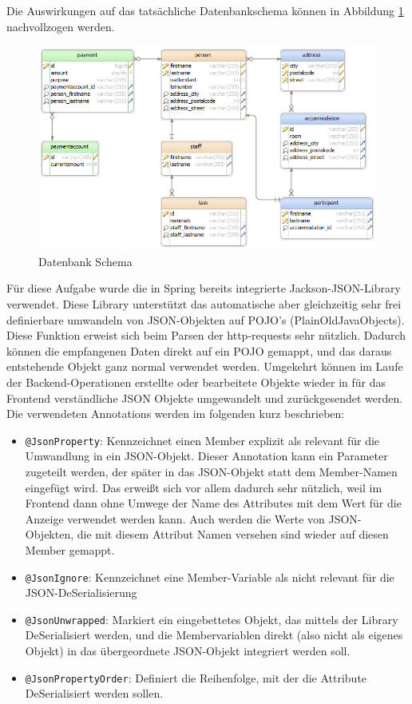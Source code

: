 Die Auswirkungen auf das tatsächliche Datenbankschema können in Abbildung \ref{fig:db_scheme} nachvollzogen werden.

\begin{figure}[h]
	\centering
	\includegraphics[width=0.9\linewidth]{3_backend/pics/db_scheme}
	\caption{Datenbank Schema}
	\label{fig:db_scheme}
\end{figure}


Für diese Aufgabe wurde die in Spring bereits integrierte Jackson-JSON-Library verwendet. Diese Library unterstützt das automatische aber gleichzeitig sehr frei definierbare umwandeln von JSON-Objekten auf POJO's (PlainOldJavaObjects). Diese Funktion erweist sich beim Parsen der http-requests sehr nützlich. Dadurch können die empfangenen Daten direkt auf ein POJO gemappt, und das daraus entstehende Objekt ganz normal verwendet werden. Umgekehrt können im Laufe der Backend-Operationen erstellte oder bearbeitete Objekte wieder in für das Frontend verständliche JSON Objekte umgewandelt und zurückgesendet werden. Die verwendeten Annotations werden im folgenden kurz beschrieben:

\begin{itemize}
	\item \verb|@JsonProperty|: Kennzeichnet einen Member explizit als relevant für die Umwandlung in ein JSON-Objekt. Dieser Annotation kann ein Parameter zugeteilt werden, der später in das JSON-Objekt statt dem Member-Namen eingefügt wird. Das erweißt sich vor allem dadurch sehr nützlich, weil im Frontend dann ohne Umwege der Name des Attributes mit dem Wert für die Anzeige verwendet werden kann. Auch werden die Werte von JSON-Objekten, die mit diesem Attribut Namen versehen sind wieder auf diesen Member gemappt.
	\item \verb|@JsonIgnore|: Kennzeichnet eine Member-Variable als nicht relevant für die JSON-DeSerialisierung
	\item \verb|@JsonUnwrapped|: Markiert ein eingebettetes Objekt, das mittels der Library DeSerialisiert werden, und die Membervariablen direkt (also nicht als eigenes Objekt) in das übergeordnete JSON-Objekt integriert werden soll.
	\item \verb|@JsonPropertyOrder|: Definiert die Reihenfolge, mit der die Attribute DeSerialisiert werden sollen.
\end{itemize}

